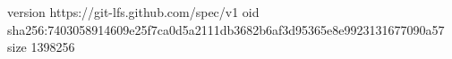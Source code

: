 version https://git-lfs.github.com/spec/v1
oid sha256:7403058914609e25f7ca0d5a2111db3682b6af3d95365e8e9923131677090a57
size 1398256
